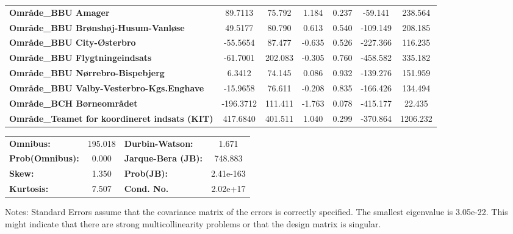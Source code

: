 \begin{center}
\begin{tabular}{lcccccc}
\textbf{Område\_BBU Amager}                                                                                                    &      89.7113  &       75.792     &     1.184  &         0.237        &      -59.141    &      238.564     \\
\textbf{Område\_BBU Brønshøj-Husum-Vanløse}                                                                                    &      49.5177  &       80.790     &     0.613  &         0.540        &     -109.149    &      208.185     \\
\textbf{Område\_BBU City-Østerbro}                                                                                             &     -55.5654  &       87.477     &    -0.635  &         0.526        &     -227.366    &      116.235     \\
\textbf{Område\_BBU Flygtningeindsats}                                                                                         &     -61.7001  &      202.083     &    -0.305  &         0.760        &     -458.582    &      335.182     \\
\textbf{Område\_BBU Nørrebro-Bispebjerg}                                                                                       &       6.3412  &       74.145     &     0.086  &         0.932        &     -139.276    &      151.959     \\
\textbf{Område\_BBU Valby-Vesterbro-Kgs.Enghave}                                                                               &     -15.9658  &       76.611     &    -0.208  &         0.835        &     -166.426    &      134.494     \\
\textbf{Område\_BCH Børneområdet}                                                                                              &    -196.3712  &      111.411     &    -1.763  &         0.078        &     -415.177    &       22.435     \\
\textbf{Område\_Teamet for koordineret indsats (KIT)}                                                                          &     417.6840  &      401.511     &     1.040  &         0.299        &     -370.864    &     1206.232     \\
\bottomrule
\end{tabular}
\begin{tabular}{lclc}
\textbf{Omnibus:}       & 195.018 & \textbf{  Durbin-Watson:     } &     1.671  \\
\textbf{Prob(Omnibus):} &   0.000 & \textbf{  Jarque-Bera (JB):  } &   748.883  \\
\textbf{Skew:}          &   1.350 & \textbf{  Prob(JB):          } & 2.41e-163  \\
\textbf{Kurtosis:}      &   7.507 & \textbf{  Cond. No.          } &  2.02e+17  \\
\bottomrule
\end{tabular}
\end{center}

Notes: \newline
 [1] Standard Errors assume that the covariance matrix of the errors is correctly specified. \newline
 [2] The smallest eigenvalue is 3.05e-22. This might indicate that there are \newline
 strong multicollinearity problems or that the design matrix is singular.
\newpage 

